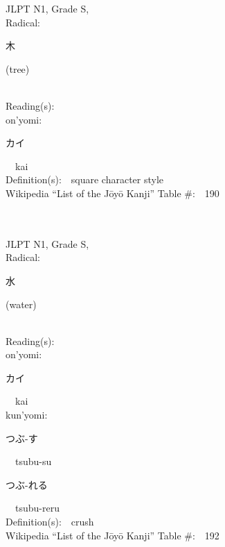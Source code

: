 \begin{multicols}{2}
{JLPT N1, Grade S, \\Radical:\ \ {\begin{CJK}{UTF8}{min} 木 \end{CJK}} (tree) } \\
Reading(s):\ \ \\
{\hspace*{1em}}on'yomi:\ \ \\
{\hspace*{2em}}{\begin{CJK}{UTF8}{min} カイ \end{CJK}}\ \ kai\ \ \\
Definition(s):\ \ square character style \\
Wikipedia ``List of the J\=oy\=o Kanji'' Table \#:\ \ 190 \\
\ \ \\
{\fontsize{34pt}{40pt}  }\ \ \\
{JLPT N1, Grade S, \\Radical:\ \ {\begin{CJK}{UTF8}{min} 水 \end{CJK}} (water) } \\
Reading(s):\ \ \\
{\hspace*{1em}}on'yomi:\ \ \\
{\hspace*{2em}}{\begin{CJK}{UTF8}{min} カイ \end{CJK}}\ \ kai\ \ \\
{\hspace*{1em}}kun'yomi:\ \ \\
{\hspace*{2em}}{\begin{CJK}{UTF8}{min} つぶ-す \end{CJK}}\ \ tsubu-su\ \ \\
{\hspace*{2em}}{\begin{CJK}{UTF8}{min} つぶ-れる \end{CJK}}\ \ tsubu-reru\ \ \\
Definition(s):\ \ crush \\
Wikipedia ``List of the J\=oy\=o Kanji'' Table \#:\ \ 192 \\
\ \ \\
{\fontsize{34pt}{40pt}  }\ \ \\

\end{multicols}

